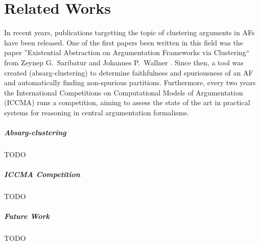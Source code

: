 \chapter{Related Works}
In recent years, publications targetting the topic of clustering arguments in AFs have been released. One of the first papers been written in this field was the paper ''Existential Abstraction on Argumentation Frameworks via Clustering`` from Zeynep G.\ Saribatur and Johannes P.\ Wallner \cite{DBLP:conf/kr/SaribaturW21}. Since then, a tool was created (absarg-clustering)\cite{GitHub:repoRelatedTool} to determine faithfulness and spuriousness of an AF and automatically finding non-spurious partitions. Furthermore, every two years the International Competitions on Computational Models of Argumentation (ICCMA) \cite{COMP:ICCMA2023} runs a competition, aiming to assess the state of the art in practical systems for reasoning in central argumentation formalisms.

\paragraph{Absarg-clustering} TODO

\paragraph{ICCMA Competition} TODO

\paragraph{Future Work} TODO